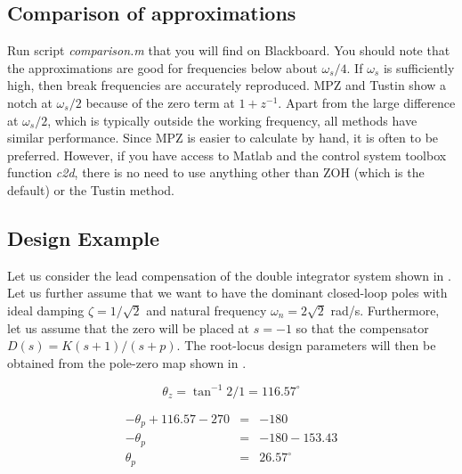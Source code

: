 \subsection*{Comparison of approximations}

Run script \emph{comparison.m} that you will find on Blackboard. You should note that the approximations are good for frequencies below about $\omega_s/4$. If $\omega_s$ is sufficiently high, then break frequencies are accurately reproduced. MPZ and Tustin show a notch at $\omega_s/2$ because of the zero term at $1+z^{-1}$. Apart from the large difference at $\omega_s/2$, which is typically outside the working frequency, all methods have similar performance. Since MPZ is easier to calculate by hand, it is often to be preferred. However, if you have access to Matlab and the control system toolbox function \emph{c2d}, there is no need to use anything other than ZOH (which is the default) or the Tustin method.

\begin{slide}
	\label{slides:ex1-1}
\end{slide}


\subsection*{Design Example}

Let us consider the lead compensation of the double integrator system shown in . Let us further assume that we want to have the dominant closed-loop poles with ideal damping $\zeta=1/\sqrt{2}$ and natural frequency $\omega_n = 2\sqrt{2}$ rad/s. Furthermore, let us assume that the zero will be placed at $s=-1$ so that the compensator $D(s) = K(s+1)/(s+p)$. The root-locus design parameters will then be obtained from the pole-zero map shown in .

$$\theta_z = \tan^{-1} 2/1 = 116.57^\circ$$

\begin{eqnarray*}
	-\theta_p + 116.57 -270 & = & -180 \\
	-\theta_p & = & -180 - 153.43 \\
	\theta_p & = & 26.57^\circ
\end{eqnarray*}


